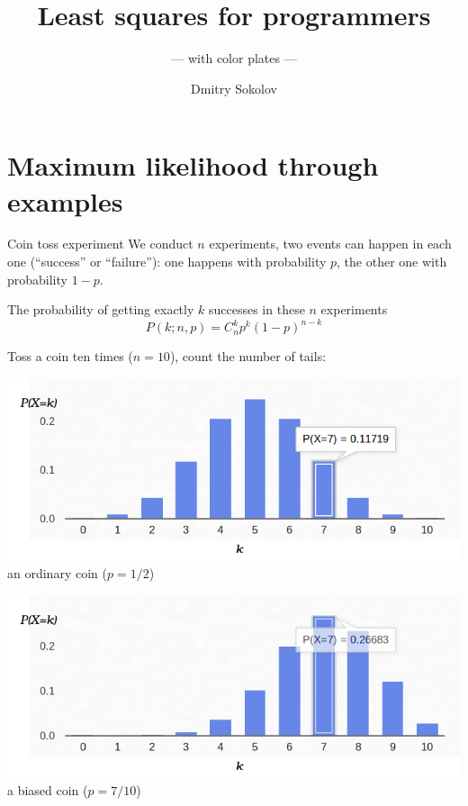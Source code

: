\documentclass[UKenglish,aspectratio=169]{beamer}
\author{Dmitry Sokolov}
\title{Least squares for programmers}
\subtitle{--- with color plates ---}
\begin{document}


\section{Maximum likelihood through examples}
\begin{frame}{Coin toss experiment}
We conduct $n$ experiments, two events can happen in each one (``success'' or ``failure''):
one happens with probability $p$, the other one with probability $1-p$.

\pause
\begin{block}{The probability of getting exactly $k$ successes in these $n$ experiments}
$$
P(k;n,p) = C_n^k p^k (1-p)^{n-k}
$$
\end{block}

\pause
Toss a coin ten times ($n=10$), count the number of tails:
\begin{minipage}{.45\linewidth}
\centering
\includegraphics[width=\columnwidth]{../manuscript/img/binomial-05.png}
an ordinary coin ($p=1/2$)
\end{minipage}
\pause
\begin{minipage}{.45\linewidth}
\centering
\includegraphics[width=\columnwidth]{../manuscript/img/binomial-07.png}
a biased coin ($p=7/10$)
\end{minipage}
\end{frame}
\end{document}
